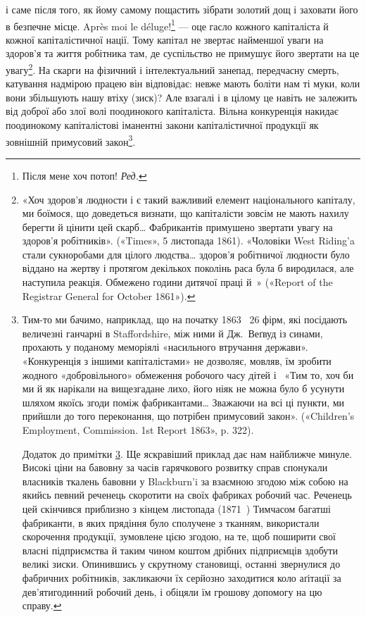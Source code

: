 і саме після того, як йому самому пощастить зібрати золотий
дощ і заховати його в безпечне місце. Après moi le déluge!\footnote*{
Після мене хоч потоп! \emph{Ред.}
} —
оце гасло кожного капіталіста й кожної капіталістичної нації.
Тому капітал не звертає найменшої уваги на здоров’я та життя
робітника там, де суспільство не примушує його звертати на це
увагу\footnote{
«Хоч здоров'я людности і є такий важливий елемент національного
капіталу, ми боїмося, що доведеться визнати, що капіталісти зовсім
не мають нахилу берегти й цінити цей скарб\dots{} Фабрикантів примушено
звертати увагу на здоров'я робітників». («Times», 5 листопада 1861).
«Чоловіки West Riding’a стали сукноробами для цілого людства\dots{} здоров’я
робітничої людности було віддано на жертву і протягом декількох
поколінь раса була б виродилася, але наступила реакція. Обмежено
години дитячої праці й~» («Report of the Registrar General for October
1861»).
}. На скарги на фізичний і інтелектуальний занепад,
передчасну смерть, катування надмірою працею він відповідає:
невже мають боліти нам ті муки, коли вони збільшують нашу
втіху (зиск)? Але взагалі і в цілому це навіть не залежить від
доброї або злої волі поодинокого капіталіста. Вільна конкуренція
накидає поодинокому капіталістові іманентні закони капіталістичної
продукції як зовнішній примусовий закон\footnote{
\label{footnote-210}Тим-то ми бачимо, наприклад, що на початку 1863~ 26 фірм,
які посідають величезні ганчарні в Staffordshire, між ними й Дж.~Веґвуд
із синами, прохають у поданому меморіялі «насильного втручання держави».
«Конкуренція з іншими капіталістами» не дозволяє, мовляв, їм
зробити жодного «добровільного» обмеження робочого часу дітей і~
«Тим то, хоч би ми й як нарікали на вищезгадане лихо, його ніяк не можна
було б усунути шляхом якоїсь згоди поміж фабрикантами\dots{} Зважаючи на
всі ці пункти, ми прийшли до того переконання, що потрібен примусовий
закон». («Children’s Employment, Commission. 1st Report 1863»,
p. 322).

Додаток до примітки \ref{footnote-210}. Ще яскравіший приклад дає нам найближче
минуле. Високі ціни на бавовну за часів гарячкового розвитку справ спонукали
власників ткалень бавовни у Blackburn’i за взаємною згодою між
собою на якийсь певний реченець скоротити на своїх фабриках робочий
час. Реченець цей скінчився приблизно з кінцем листопада (1871~)
Тимчасом багатші фабриканти, в яких прядіння було сполучене з тканням,
використали скорочення продукції, зумовлене цією згодою, на те, щоб
поширити свої власні підприємства й таким чином коштом дрібних підприємців
здобути великі зиски. Опинившись у скрутному становищі,
останні звернулися до фабричних робітників, закликаючи їх серйозно
заходитися коло аґітації за дев’ятигодинний робочий день, і обіцяли їм
грошову допомогу на цю справу.
}.

